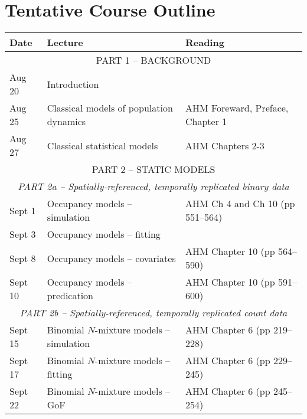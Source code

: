 \documentclass[12pt]{article}
\begin{document}

\section*{\normalsize Tentative Course Outline}
\vspace{-6mm}

\begin{center}
\begin{tabular}[c]{lll}
\hline \hline
{\bf Date} & {\bf Lecture}                                & {\bf Reading}                    \\
\hline
           \multicolumn{3}{c}{PART 1 -- BACKGROUND}                                          \\
\hline
Aug 20     & Introduction                                 &                                  \\
\hline
Aug 25     & Classical models of population dynamics      & AHM Foreward, Preface, Chapter 1     \\
Aug 27     & Classical statistical models                 & AHM Chapters 2-3                 \\
\hline
           \multicolumn{3}{c}{PART 2 -- STATIC MODELS}                                      \\
           \multicolumn{3}{c}{\it PART 2a -- Spatially-referenced, temporally replicated binary data}             \\
\hline
Sept 1     & Occupancy models -- simulation               & AHM Ch 4 and Ch 10 (pp 551--564) \\
Sept 3     & Occupancy models -- fitting                  &                                  \\
\hline
Sept 8     & Occupancy models -- covariates               & AHM Chapter 10 (pp 564--590)     \\
Sept 10    & Occupancy models -- predication              & AHM Chapter 10 (pp 591--600)     \\
\hline
           \multicolumn{3}{c}{\it PART 2b -- Spatially-referenced, temporally replicated count data}             \\
\hline
Sept 15    & Binomial $N$-mixture models -- simulation    & AHM Chapter 6 (pp 219--228)      \\
Sept 17    & Binomial $N$-mixture models -- fitting       & AHM Chapter 6 (pp 229--245)      \\
\hline
Sept 22    & Binomial $N$-mixture models -- GoF           & AHM Chapter 6 (pp 245--254)      \\

\end{tabular}
\end{center}
\end{document}
